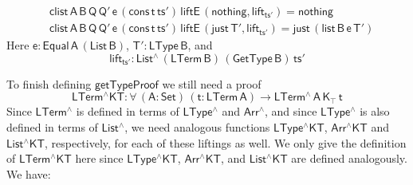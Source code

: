 \documentclass[sigplan,10pt,anonymous,review]{acmart}
\begin{document}
\begin{align*}
  &\mathsf{clist\, A\, B\, Q\, Q'\, e\, (cons\, t\, ts') \, liftE\,
    (nothing , lift_{ts'}) = nothing} \\ 
  &\mathsf{clist\, A\, B\, Q\, Q'\, e\, (cons\, t\, ts') \, liftE\,
    (just\, T' , lift_{ts'}) = just \, (list\, B\, e\, T')} 
\end{align*}
Here $\mathsf{e : Equal\, A\, (List\,B)}$, $\mathsf{T' : LType\, B}$,
and
\[\mathsf{lift_{ts'} : List^{\wedge}\, (LTerm\, B)\, (GetType\,
  B)\, ts'}\]

To finish defining $\mathsf{getTypeProof}$ we still need a proof
\[ \mathsf{LTerm^\wedge KT : \forall\, (A : Set)\, (t : LTerm\, A) \to
  LTerm^{\wedge}\, A\, K_\top\,t} \] Since $\mathsf{LTerm^\wedge}$ is
defined in terms of $\mathsf{LType^\wedge}$ and $\mathsf{Arr^\wedge}$,
and since $\mathsf{LType^\wedge}$ is also defined in terms of
$\mathsf{List^\wedge}$, we need analogous functions
$\mathsf{LType^\wedge KT}$, $\mathsf{Arr^\wedge KT}$ and
$\mathsf{List^\wedge KT}$, respectively, for each of these liftings as
well.  We only give the definition of $\mathsf{LTerm^\wedge KT}$ here
since $\mathsf{LType^\wedge KT}$, $\mathsf{Arr^\wedge KT}$, and
$\mathsf{List^\wedge KT}$ are defined analogously. We have:
\end{document}
